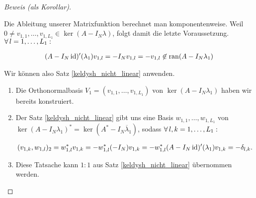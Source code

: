 \begin{proof}[Beweis (als Korollar)]
\begin{enumerate}[label = \arabic*.]
        Die Ableitung unserer Matrixfunktion berechnet man komponentenweise.
        Weil $0 \neq v_{1, 1}, \dots, v_{1, L_1} \in \ker (A - I_N \lambda)$, folgt damit die letzte Voraussetzung.
        $\forall \, l = 1, \dots, L_1:$

        \begin{align*}
            (A - I_N \operatorname{id})^\prime(\lambda_1) v_{1, l}
            =
            -I_N v_{1, l}
            =
            -v_{1, l}
            \not \in
            \operatorname{ran} (A - I_N \lambda_1)
        \end{align*}

    \end{enumerate}

    Wir können also Satz \ref{keldysh_nicht_linear} anwenden.
    
    \begin{enumerate}[label = (\roman*)]

        \item Die Orthonormalbasis $V_1 = (v_{1, 1}, \dots, v_{1, L_1})$ von $\ker (A - I_N \lambda_1)$ haben wir bereits konstruiert.
        
        \item Der Satz \ref{keldysh_nicht_linear} gibt uns eine Basis $w_{1, 1}, \dots, w_{1, L_1}$ von $\ker (A - I_N \lambda_1)^\ast = \ker (A^\ast - I_N \overline \lambda_1)$, sodass $\forall \, l, k = 1, \dots, L_1:$
        
        \begin{align*}
            (v_{1, k}, w_{1, l})_2
            =
            w_{1, l}^\ast v_{1, k}
            =
            -w_{1, l}^\ast (-I_N) v_{1, k}
            =
            -w_{1, l}^\ast (A - I_N \operatorname{id})^\prime(\lambda_1) v_{1, k}
            =
            -\delta_{l, k}.
        \end{align*}

        \item Diese Tatsache kann $1 : 1$ aus Satz \ref{keldysh_nicht_linear} übernommen werden.

    \end{enumerate}
    
\end{proof}
